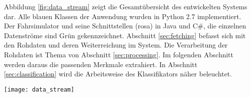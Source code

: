 \label{chap:implementation}

Abbildung \ref{fig:data_stream} zeigt die Gesamtübersicht des entwickelten Systems dar. Alle blauen Klassen der Anwendung wurden in Python 2.7 implementiert. Der Fahrsimulator und seine Schnittstellen (rosa) in Java und C\#, die einzelnen Datenströme sind Grün gekennzeichnet. Abschnitt \ref{sec:fetching} befasst sich mit den Rohdaten und deren Weiterreichung im System. Die Verarbeitung der Rohdaten ist Thema von Abschnitt \ref{sec:processing}. Im folgenden Abschnitt werden daraus die passenden Merkmale extrahiert. In Abschnitt \ref{sec:classification} wird die Arbeitsweise des Klassifikators näher beleuchtet. 


\begin{figure*} 
  \begin{center}
    \texttt{[image: data\_stream]}
    \caption[Aufbau]{Der Aufbau des entwickelten System zur Müdigkeitserkennung. \label{fig:data_stream}}
  \end{center}
\end{figure*}